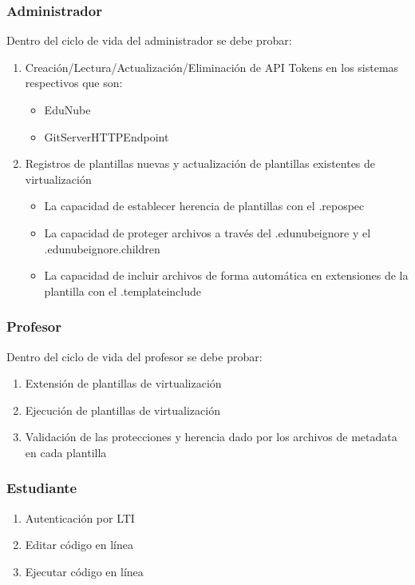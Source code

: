 \subsubsection{Administrador}
Dentro del ciclo de vida del administrador se debe probar:
\begin{enumerate}
  \item Creación/Lectura/Actualización/Eliminación de API Tokens en los sistemas respectivos que son:
  \begin{itemize}
    \item EduNube
    \item GitServerHTTPEndpoint
  \end{itemize}
  \item Registros de plantillas nuevas y actualización de plantillas existentes de virtualización
  \begin{itemize}
    \item La capacidad de establecer herencia de plantillas con el .repospec
    \item La capacidad de proteger archivos a través del  .edunubeignore y el .edunubeignore.children
    \item La capacidad de incluir archivos de forma automática en extensiones de la plantilla con el .templateinclude
  \end{itemize}
\end{enumerate}

\subsubsection{Profesor}
Dentro del ciclo de vida del profesor se debe probar:
\begin{enumerate}
  \item Extensión de plantillas de virtualización
  \item Ejecución de plantillas de virtualización
  \item Validación de las protecciones y herencia dado por los archivos de metadata en cada plantilla
\end{enumerate}

\subsubsection{Estudiante}
\begin{enumerate}
  \item Autenticación por LTI
  \item Editar código en línea
  \item Ejecutar código en línea
\end{enumerate}

